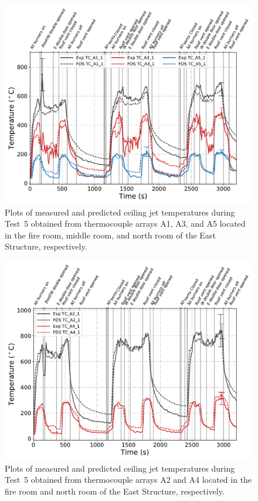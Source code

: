 \begin{figure}[!h]
	\centering
	\includegraphics[width=\columnwidth]{Figures/Plots/Validation/Temperature/Test_5_cjet_1}
	\caption[Plots of measured and predicted ceiling jet temperatures during Test~5.]{Plots of measured and predicted ceiling jet temperatures during Test~5 obtained from thermocouple arrays A1, A3, and A5 located in the fire room, middle room, and north room of the East Structure, respectively.}
	\label{fig:cjet1_data_Test5}
\end{figure}

\begin{figure}[!h]
	\centering
	\includegraphics[width=\columnwidth]{Figures/Plots/Validation/Temperature/Test_5_cjet_2}
	\caption[Plots of measured and predicted ceiling jet temperatures during Test~5.]{Plots of measured and predicted ceiling jet temperatures during Test~5 obtained from thermocouple arrays A2 and A4 located in the fire room and north room of the East Structure, respectively.}
	\label{fig:cjet2_data_Test5}
\end{figure}

